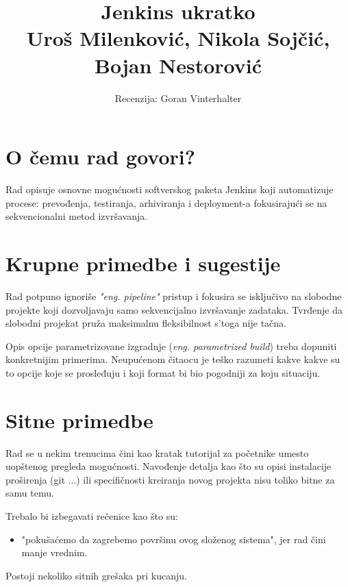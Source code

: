 \documentclass[a4paper]{article}
\begin{document}
\title{Jenkins ukratko\\
  \small{Uroš Milenković, Nikola Sojčić, Bojan Nestorović
}}

\author{Recenzija: Goran Vinterhalter}



\maketitle

\section{O čemu rad govori?}
Rad opisuje osnovne mogućnosti softverskog paketa Jenkins koji automatizuje
procese: prevođenja, testiranja, arhiviranja i deployment-a fokusirajući se na 
sekvencionalni metod izvršavanja.

\section{Krupne primedbe i sugestije}

Rad potpuno ignoriše \textit{"eng. pipeline"} pristup i fokusira se isključivo na slobodne
projekte koji dozvoljavaju samo sekvencijalno izvršavanje zadataka. Tvrđenje da slobodni
projekat pruža maksimalnu fleksibilnost s'toga nije tačna.

Opis opcije parametrizovane izgradnje (\textit{eng. parametrized build}) treba
dopuniti konkretnijim primerima. Neupućenom čitaocu je teško razumeti kakve kakve su
to opcije koje se prosleđuju i koji format bi bio pogodniji za koju situaciju.

\section{Sitne primedbe}
Rad se u nekim trenucima čini kao kratak tutorijal za početnike umesto uopštenog
pregleda mogućnosti. Navođenje detalja kao što su opisi instalacije proširenja
(git ...) ili specifičnosti kreiranja novog projekta nisu toliko bitne za 
samu temu.

Trebalo bi izbegavati rečenice kao što su:
\begin{itemize}
  \item "pokušaćemo da zagrebemo površinu ovog složenog sistema", jer rad čini manje vrednim.
\end{itemize}
Postoji nekoliko sitnih grešaka pri kucanju.
\end{document}
